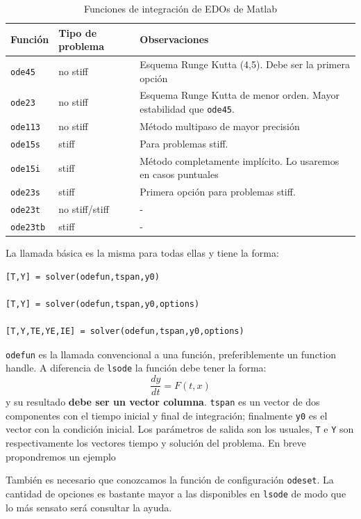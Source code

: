 %
\begin{table}[H]
\centering{}\begin{tabular}{|m{2cm}|>{\centering}m{3cm}|>{\raggedright}p{10cm}|}
\hline 
Función&
Tipo de problema&
Observaciones\tabularnewline
\hline
\hline 
\texttt{ode45\index{ode45}}&
no stiff&
Esquema Runge Kutta (4,5). Debe ser la primera opción\tabularnewline
\hline 
\texttt{ode23\index{ode23}}&
no stiff&
Esquema Runge Kutta de menor orden. Mayor estabilidad que \texttt{ode45}.\tabularnewline
\hline 
\texttt{ode113\index{ode113}}&
no stiff&
Método multipaso de mayor precisión\tabularnewline
\hline 
\texttt{ode15s\index{ode15s}}&
stiff&
Para problemas stiff.\tabularnewline
\hline 
\texttt{ode15i\index{ode15i}}&
stiff&
Método completamente implícito. Lo usaremos en casos puntuales\tabularnewline
\hline 
\texttt{ode23s\index{ode23s}}&
stiff&
Primera opción para problemas stiff.\tabularnewline
\hline 
\texttt{ode23t\index{ode23t}}&
no stiff/stiff&
-\tabularnewline
\hline 
\texttt{ode23tb\index{ode23tb}}&
stiff&
-\tabularnewline
\hline
\end{tabular}


\caption{\label{cap:Funciones-de-integraci=F3n}Funciones de integración de
EDOs de Matlab}
\end{table}


La llamada básica es la misma para todas ellas y tiene la forma:

  \begin{verbatim}
[T,Y] = solver(odefun,tspan,y0)

[T,Y] = solver(odefun,tspan,y0,options)

[T,Y,TE,YE,IE] = solver(odefun,tspan,y0,options)
 \end{verbatim}
\texttt{odefun} es la llamada convencional a una función, preferiblemente
un function handle. A diferencia de \texttt{lsode} la función debe
tener la forma:
$$\frac{dy}{dt}=F(t,x)$$
y su resultado \textbf{debe ser un vector columna}. \texttt{tspan}
es un vector de dos componentes con el tiempo inicial y final de integración;
finalmente \texttt{y0} es el vector con la condición inicial. Los
parámetros de salida son los usuales, \texttt{T} e \texttt{Y} son
respectivamente los vectores tiempo y solución del problema. En breve
propondremos un ejemplo

También es necesario que conozcamos la función de configuración \texttt{odeset}.
La cantidad de opciones es bastante mayor a las disponibles en \texttt{lsode}
de modo que lo más sensato será consultar la ayuda.


